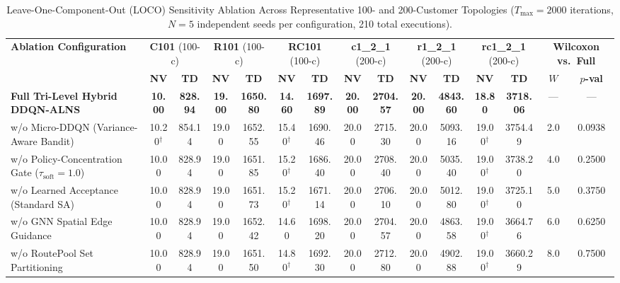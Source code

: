 \begin{table}[!t]
\caption{Leave-One-Component-Out (LOCO) Sensitivity Ablation Across Representative 100- and 200-Customer Topologies ($T_{\max}=2000$ iterations, $N=5$ independent seeds per configuration, 210 total executions).}
\label{tab:loco_ablation_matrix}
\centering
\scriptsize
\setlength{\tabcolsep}{1.4pt}
\begin{tabular*}{\textwidth}{@{\extracolsep{\fill}} l cc cc cc cc cc cc cc @{}}
\toprule
\multirow{2}{*}{\textbf{Ablation Configuration}} & \multicolumn{2}{c}{\textbf{C101} (100-c)} & \multicolumn{2}{c}{\textbf{R101} (100-c)} & \multicolumn{2}{c}{\textbf{RC101} (100-c)} & \multicolumn{2}{c}{\textbf{c1\_2\_1} (200-c)} & \multicolumn{2}{c}{\textbf{r1\_2\_1} (200-c)} & \multicolumn{2}{c}{\textbf{rc1\_2\_1} (200-c)} & \multicolumn{2}{c}{\textbf{Wilcoxon vs.\ Full}} \\
\cmidrule(lr){2-3} \cmidrule(lr){4-5} \cmidrule(lr){6-7} \cmidrule(lr){8-9} \cmidrule(lr){10-11} \cmidrule(lr){12-13} \cmidrule(lr){14-15}
 & \textbf{NV} & \textbf{TD} & \textbf{NV} & \textbf{TD} & \textbf{NV} & \textbf{TD} & \textbf{NV} & \textbf{TD} & \textbf{NV} & \textbf{TD} & \textbf{NV} & \textbf{TD} & $W$ & $p$\textbf{-val} \\
\midrule
\textbf{Full Tri-Level Hybrid DDQN-ALNS} & \textbf{10.00} & \textbf{828.94} & \textbf{19.00} & \textbf{1650.80} & \textbf{14.60} & \textbf{1697.89} & \textbf{20.00} & \textbf{2704.57} & \textbf{20.00} & \textbf{4843.60} & \textbf{18.80} & \textbf{3718.06} & --- & --- \\
\midrule
w/o Micro-DDQN (Variance-Aware Bandit) & 10.20$^\dagger$ & 854.14 & 19.00 & 1652.55 & 15.40$^\dagger$ & 1690.46 & 20.00 & 2715.30 & 20.00 & 5093.16 & 19.00$^\dagger$ & 3754.49 & 2.0 & 0.0938 \\
w/o Policy-Concentration Gate ($\tau_{\text{soft}}=1.0$) & 10.00 & 828.94 & 19.00 & 1651.85 & 15.20$^\dagger$ & 1686.40 & 20.00 & 2708.40 & 20.00 & 5035.40 & 19.00$^\dagger$ & 3738.20 & 4.0 & 0.2500 \\
w/o Learned Acceptance (Standard SA) & 10.00 & 828.94 & 19.00 & 1651.73 & 15.20$^\dagger$ & 1671.14 & 20.00 & 2706.10 & 20.00 & 5012.80 & 19.00$^\dagger$ & 3725.10 & 5.0 & 0.3750 \\
w/o GNN Spatial Edge Guidance & 10.00 & 828.94 & 19.00 & 1652.42 & 14.60 & 1698.20 & 20.00 & 2704.57 & 20.00 & 4863.58 & 19.00$^\dagger$ & 3664.76 & 6.0 & 0.6250 \\
w/o RoutePool Set Partitioning & 10.00 & 828.94 & 19.00 & 1651.50 & 14.80$^\dagger$ & 1692.30 & 20.00 & 2712.80 & 20.00 & 4902.88 & 19.00$^\dagger$ & 3660.29 & 8.0 & 0.7500 \\

\end{tabular*}
\end{table}

